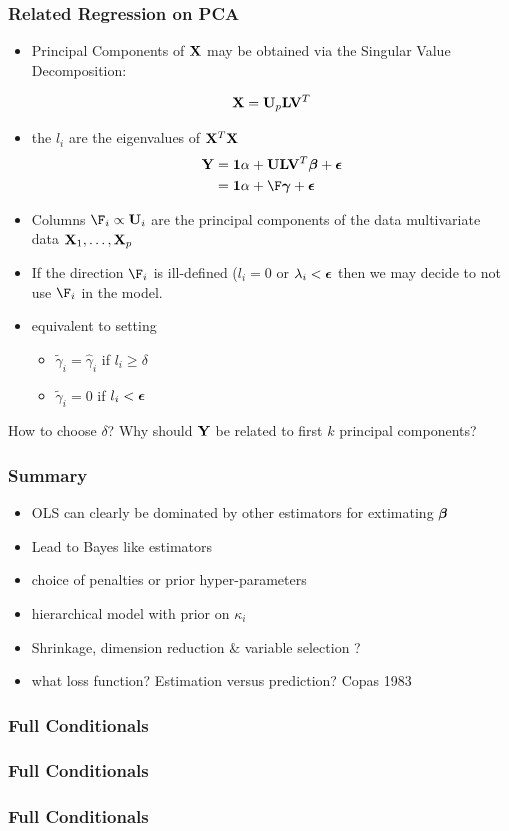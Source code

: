 \documentclass[handout]{beamer}
\begin{document}
\begin{frame} \frametitle{Related Regression on PCA}
  \begin{itemize}
  \item 
  Principal Components of $\mathbf{X}$ may be obtained via the Singular Value
  Decomposition:  

$$\mathbf{X} = \mathbf{U}_p \mathbf{L} \mathbf{V}^T$$   
\pause
\item the $l_i$ are the eigenvalues of $\mathbf{X}^T\mathbf{X}$ \pause
  \begin{align*}
 \Y & = \one \alpha + \U \L \V^T \b + \eps  \\
    & = \one \alpha + \F \g + \eps \\ 
  \end{align*}
\item Columns $\F_i \propto \U_i$ are the principal components of the
  data multivariate data $\mathbf{X}_1, \ldots, \mathbf{X}_p$ \pause
\item If the direction $\F_i$ is ill-defined ($l_i = 0$  or $\lambda_i < \boldsymbol{\epsilon}$
     then we may decide to not use $\F_i$ in the model.  \pause
\item equivalent to setting
  \begin{itemize}
  \item $\tilde{\gamma}_i = \hat{\gamma}_i$ if  $l_i\geq \delta$
  \item $\tilde{\gamma}_i = 0$ if  $l_i < \boldsymbol{\epsilon}$ \pause
  \end{itemize}
  \end{itemize}
How to choose $\delta$?   Why should $\mathbf{Y}$ be related to first $k$
principal components?
\end{frame}
\begin{frame} \frametitle{Summary }

  \begin{itemize}
  \item OLS can clearly be dominated by other estimators for
    extimating $\boldsymbol{\beta}$  \pause
  \item Lead to Bayes like estimators \pause
  \item choice of penalties or prior hyper-parameters \pause
  \item hierarchical model with prior on $\kappa_i$ \pause
  \item Shrinkage, dimension reduction \& variable selection ? \pause
  \item what loss function?  Estimation versus prediction?  Copas 1983
  \end{itemize}

\end{frame}

\begin{frame} \frametitle{Full Conditionals}
  
\end{frame}

\begin{frame} \frametitle{Full Conditionals}
  
\end{frame}

\begin{frame} \frametitle{Full Conditionals}
   
\end{frame}
\end{document}
